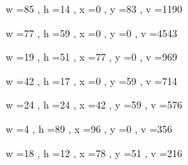 \documentclass[11pt]{article}
\begin{document}
w =85 , h =14 , x =0 , y =83 , v =1190
\par
w =77 , h =59 , x =0 , y =0 , v =4543
\par
w =19 , h =51 , x =77 , y =0 , v =969
\par
w =42 , h =17 , x =0 , y =59 , v =714
\par
w =24 , h =24 , x =42 , y =59 , v =576
\par
w =4 , h =89 , x =96 , y =0 , v =356
\par
w =18 , h =12 , x =78 , y =51 , v =216
\par
\newpage
\end{document}

